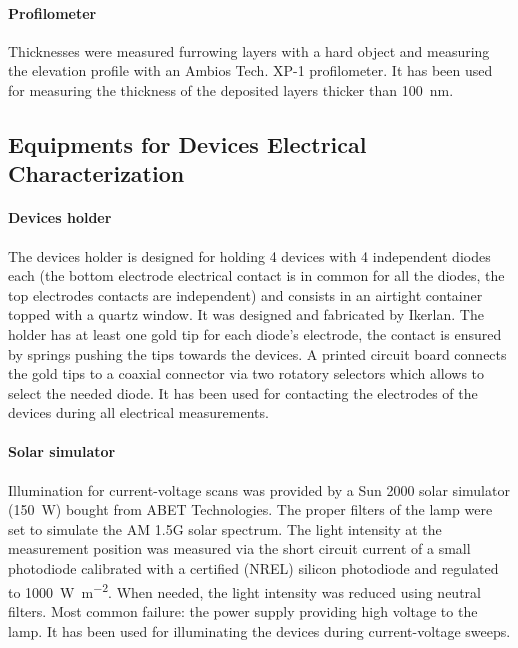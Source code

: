 	\paragraph{Profilometer} Thicknesses were measured furrowing layers with a hard object and measuring the elevation profile with an Ambios Tech. XP-1 profilometer.
	It has been used for measuring the thickness of the deposited layers thicker than \SI{100}{\nm}.
		
	\subsection{Equipments for Devices Electrical Characterization}
	
		\paragraph{Devices holder} The devices holder is designed for holding 4 devices with 4 independent diodes each (the bottom electrode electrical contact is in common for all the diodes, the top electrodes contacts are independent) and consists in an airtight container topped with a quartz window. It was designed and fabricated by Ikerlan. The holder has at least one gold tip for each diode's electrode, the contact is ensured by springs pushing the tips towards the devices. A printed circuit board connects the gold tips to a coaxial connector via two rotatory selectors which allows to select the needed diode.
		It has been used for contacting the electrodes of the devices during all electrical measurements.
		
		\paragraph{Solar simulator}\label{solarsimulator}Illumination for current-voltage scans was provided by a Sun 2000 solar simulator (\SI{150}{\W}) bought from ABET Technologies. The proper filters of the lamp were set to simulate the AM 1.5G solar spectrum. The light intensity at the measurement position was measured via the short circuit current of a small photodiode calibrated with a certified (NREL) silicon photodiode and regulated to \SI{1000}{\W\per\m\squared}. When needed, the light intensity was reduced using neutral filters.
		Most common failure: the power supply providing high voltage to the lamp.
		It has been used for illuminating the devices during current-voltage sweeps.
		
